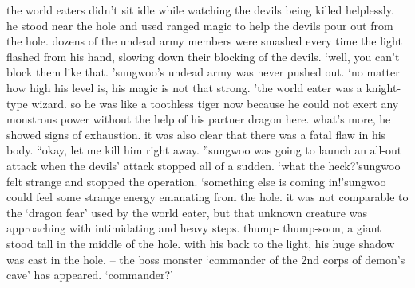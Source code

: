 the world eaters didn’t sit idle while watching the devils being killed helplessly.
 he stood near the hole and used ranged magic to help the devils pour out from the hole.
dozens of the undead army members were smashed every time the light flashed from his hand, slowing down their blocking of the devils.
‘well, you can’t block them like that.
’sungwoo’s undead army was never pushed out.
‘no matter how high his level is, his magic is not that strong.
’the world eater was a knight-type wizard.
 so he was like a toothless tiger now because he could not exert any monstrous power without the help of his partner dragon here.
what’s more, he showed signs of exhaustion.
 it was also clear that there was a fatal flaw in his body.
“okay, let me kill him right away.
”sungwoo was going to launch an all-out attack when the devils’ attack stopped all of a sudden.
‘what the heck?’sungwoo felt strange and stopped the operation.
‘something else is coming in!’sungwoo could feel some strange energy emanating from the hole.
 it was not comparable to the ‘dragon fear’ used by the world eater, but that unknown creature was approaching with intimidating and heavy steps.
thump- thump-soon, a giant stood tall in the middle of the hole.
 with his back to the light, his huge shadow was cast in the hole.
– the boss monster ‘commander of the 2nd corps of demon’s cave’ has appeared.
‘commander?’

 